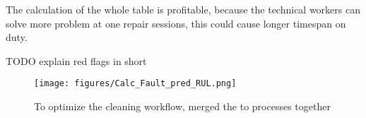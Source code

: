 		The calculation of the whole table is profitable, because the technical workers can solve more problem at one repair sessions, this could cause longer timespan on duty.

		TODO explain red flags in short
		\begin{figure}[!ht]
		\centering
		\texttt{[image: figures/Calc\_Fault\_pred\_RUL.png]}
		\caption{To optimize the cleaning workflow, merged the to processes together} 
		\end{figure}